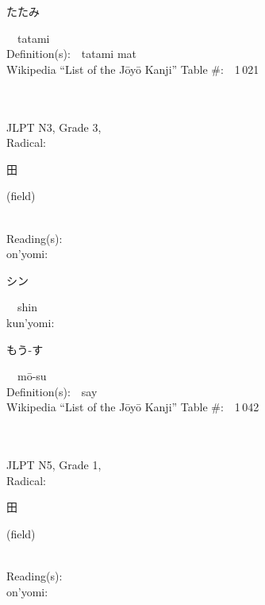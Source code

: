 \begin{multicols}{2}
{\hspace*{2em}}{\begin{CJK}{UTF8}{min} たたみ \end{CJK}}\ \ tatami\ \ \\
Definition(s):\ \ tatami mat \\
Wikipedia ``List of the J\=oy\=o Kanji'' Table \#:\ \ 1\,021 \\
\ \ \\
{\fontsize{34pt}{40pt}  }\ \ \\  %
{JLPT N3, Grade 3, \\Radical:\ \ {\begin{CJK}{UTF8}{min} 田 \end{CJK}} (field) } \\
Reading(s):\ \ \\
{\hspace*{1em}}on'yomi:\ \ \\
{\hspace*{2em}}{\begin{CJK}{UTF8}{min} シン \end{CJK}}\ \ shin\ \ \\
{\hspace*{1em}}kun'yomi:\ \ \\
{\hspace*{2em}}{\begin{CJK}{UTF8}{min} もう-す \end{CJK}}\ \ m\=o-su\ \ \\
Definition(s):\ \ say \\
Wikipedia ``List of the J\=oy\=o Kanji'' Table \#:\ \ 1\,042 \\
\ \ \\
{\fontsize{34pt}{40pt}  }\ \ \\  %
{JLPT N5, Grade 1, \\Radical:\ \ {\begin{CJK}{UTF8}{min} 田 \end{CJK}} (field) } \\
Reading(s):\ \ \\
{\hspace*{1em}}on'yomi:\ \ \\

\end{multicols}
